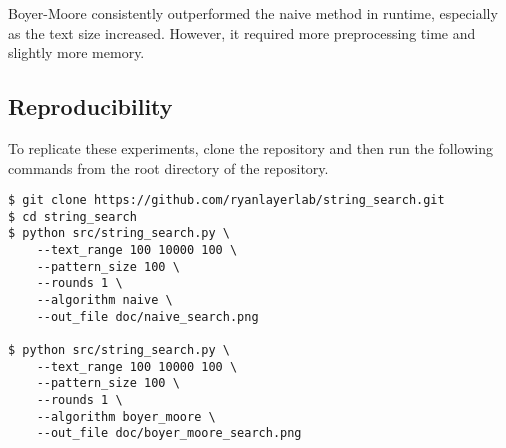 \documentclass[11pt, letterpaper]{article}
\begin{document}
Boyer-Moore consistently outperformed the naive method in runtime, especially
as the text size increased. However, it required more preprocessing time and
slightly more memory.

\subsection{Reproducibility}
To replicate these experiments, clone the repository and then run the
following commands from the root directory of the repository.
\begin{verbatim}
$ git clone https://github.com/ryanlayerlab/string_search.git
$ cd string_search
$ python src/string_search.py \
    --text_range 100 10000 100 \
    --pattern_size 100 \
    --rounds 1 \
    --algorithm naive \
    --out_file doc/naive_search.png

$ python src/string_search.py \
    --text_range 100 10000 100 \
    --pattern_size 100 \
    --rounds 1 \
    --algorithm boyer_moore \
    --out_file doc/boyer_moore_search.png
\end{verbatim}
\end{document}
